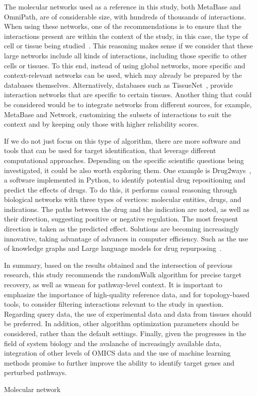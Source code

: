 The molecular networks used as a reference in this study, both MetaBase and OmniPath, are of considerable size, with hundreds of thousands of interactions. When using these networks, one of the recommendations is to ensure that the interactions present are within the context of the study, in this case, the type of cell or tissue being studied~\cite{RN38}. This reasoning makes sense if we consider that these large networks include all kinds of interactions, including those specific to other cells or tissues. To this end, instead of using global networks, more specific and context-relevant networks can be used, which may already be prepared by the databases themselves. Alternatively, databases such as TissueNet~\cite{RN137}, provide interaction networks that are specific to certain tissues. Another thing that could be considered would be to integrate networks from different sources, for example, MetaBase and Network, customizing the subsets of interactions to suit the context and by keeping only those with higher reliability scores. 

If we do not just focus on this type of algorithm, there are more software and tools that can be used for target identification, that leverage different computational approaches. Depending on the specific scientific questions being investigated, it could be also worth exploring them. One example is Drug2ways~\cite{RN132}, a software implemented in Python, to identify potential drug repositioning and predict the effects of drugs. To do this, it performs causal reasoning through biological networks with three types of vertices: molecular entities, drugs, and indications. The paths between the drug and the indication are noted, as well as their direction, suggesting positive or negative regulation. The most frequent direction is taken as the predicted effect. Solutions are becoming increasingly innovative, taking advantage of advances in computer efficiency. Such as the use of knowledge graphs and Large language models for drug repurposing~\cite{RN163}. 

In summary, based on the results obtained and the intersection of previous research, this study recommends the randomWalk algorithm for precise target recovery, as well as wmean for pathway-level context. It is important to emphasize the importance of high-quality reference data, and for topology-based tools, to consider filtering interactions relevant to the study in question. Regarding query data, the use of experimental data and data from tissues should be preferred. In addition, other algorithm optimization parameters should be considered, rather than the default settings. Finally, given the progresses in the field of system biology and the avalanche of increasingly available data, integration of other levels of OMICS data and the use of machine learning methods promise to further improve the ability to identify target genes and perturbed pathways.


\gls{Molecular network}
